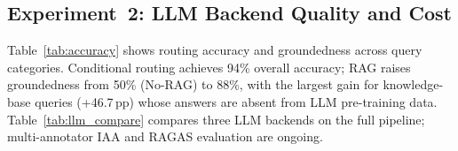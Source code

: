 \documentclass[10pt, a4paper, twocolumn]{article}
\begin{document}
\subsection{Experiment~2: LLM Backend Quality and Cost}

Table~\ref{tab:accuracy} shows routing accuracy and groundedness across
query categories.
Conditional routing achieves 94\% overall accuracy; RAG raises
groundedness from 50\% (No-RAG) to 88\%, with the largest gain for
knowledge-base queries (+46.7\,pp) whose answers are absent from LLM
pre-training data.
Table~\ref{tab:llm_compare} compares three LLM backends on the full
pipeline; multi-annotator IAA and RAGAS evaluation are ongoing.

\begin{table}[h]
  \centering
  \caption{Intent routing accuracy and RAG-grounded answer rate (\%)
           by query category.
           $\Delta$: groundedness gain, No-RAG $\to$ Full pipeline.}
  \label{tab:accuracy}
  \small
\end{table}

\begin{table}[h]
  \centering
  \caption{LLM backend comparison (50 queries, full pipeline).
           Grounded: \% responses with claims supported by retrieved
           context (single-annotator, preliminary).
           Cost: estimated USD per query.
           Multi-annotator IAA ($\alpha$) and RAGAS-F pending.}
  \label{tab:llm_compare}
  \small
\end{table}
\end{document}
